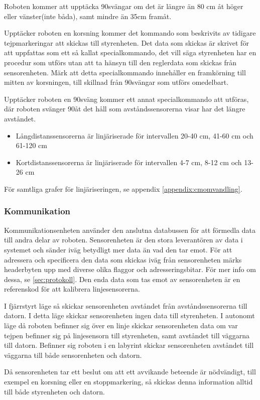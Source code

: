 Roboten kommer att upptäcka 90\degree svängar om det är längre än 80 cm åt 
höger eller vänster(inte båda), samt mindre än 35cm framåt.

Upptäcker roboten en korsning kommer det kommando som beskrivits av tidigare 
tejpmarkeringar att skickas till styrenheten. Det data som skickas är skrivet 
för att uppfattas som ett så kallat specialkommando, det vill säga 
styrenheten har en procedur som utförs utan att ta hänsyn till den reglerdata 
som skickas från sensorenheten. Märk att detta specialkommando innehåller en 
framkörning till mitten av korsningen, till skillnad från 90\degree svängar 
som utförs omedelbart.

Upptäcker roboten en 90\degree sväng kommer ett annat specialkommando att 
utföras, där roboten svänger 90\degree åt det håll som avståndssensorerna 
visar har det längre avståndet.

\begin{itemize}
\item Långdistanssensorerna är linjäriserade för intervallen 20-40 cm, 41-60 cm och 61-120 cm
\item Kortdistanssensorerna är linjäriserade för intervallen 4-7 cm, 8-12 cm och 13-26 cm
\end{itemize}
 

För samtliga grafer för linjäriseringen, se appendix \ref{appendix:cmomvandling}.


\subsubsection{Kommunikation}
Kommunikationsenheten använder den anslutna databussen för att förmedla 
data till andra delar av roboten. Sensorenheten är den stora leverantören av 
data i systemet och sänder iväg betydligt mer data än vad den tar emot. För att 
adressera och specificera den data som skickas iväg från sensorenheten märks 
headerbyten upp med diverse olika flaggor och adresseringsbitar. För mer info om 
dessa, se \ref{sec:protokoll}. Den enda data som tas emot av sensorenheten är en 
referenskod för att kalibrera linjesensorerna.

I fjärrstyrt läge så skickar sensorenheten avståndet från avståndssensorerna 
till datorn.  I detta läge skickar sensorenheten ingen data till styrenheten. 
I autonomt läge då roboten befinner sig över en linje skickar sensorenheten data om 
var tejpen befinner sig på linjesensorn till styrenheten, samt avståndet till 
väggarna till datorn. Befinner sig roboten i en labyrint skickar 
sensorenheten avståndet till väggarna till både sensorenheten och datorn.  

Då sensorenheten tar ett beslut om att ett avvikande beteende är nödvändigt, till exempel 
en korsning eller en stoppmarkering, så skickas denna information alltid till 
både styrenheten och datorn.


